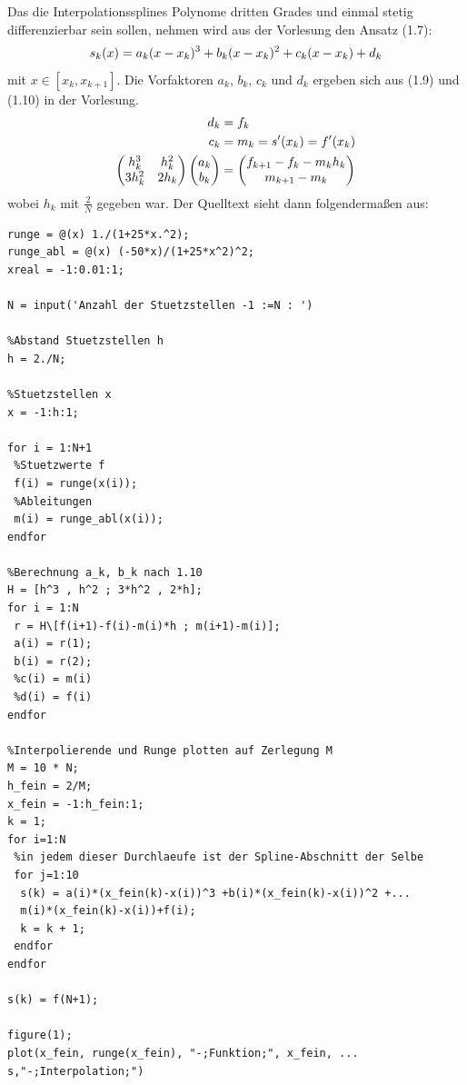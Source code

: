 \documentclass[ngerman,a4paper]{texmf/tex/latex/mathscript/mathscript}
\begin{document}
	Das die Interpolationssplines Polynome dritten Grades und einmal stetig differenzierbar sein sollen, nehmen wird aus der Vorlesung den Ansatz (1.7):
	\begin{align}
		s_k(x) = a_k(x-x_k)^3 + b_k(x-x_k)^2 + c_k(x-x_k) + d_k\notag
	\end{align}
	mit $x\in[x_k,x_{k+1}]$. Die Vorfaktoren $a_k$, $b_k$, $c_k$ und $d_k$ ergeben sich aus (1.9) und (1.10) in der Vorlesung.
	\begin{align}
		d_k &= f_k \notag \\
		c_k &= m_k = s'(x_k) = f'(x_k) \notag \\
		\begin{pmatrix}
			h_k^3 & h_k^2 \\ 3h_k^2 & 2h_k
		\end{pmatrix}\begin{pmatrix}
			a_k \\ b_k
		\end{pmatrix} &= \begin{pmatrix}
			f_{k+1} - f_k - m_kh_k \\ m_{k+1} - m_k
		\end{pmatrix}\notag
	\end{align}
	wobei $h_k$ mit $\frac{2}{N}$ gegeben war. Der Quelltext sieht dann folgendermaßen aus:
	\begin{lstlisting}
runge = @(x) 1./(1+25*x.^2);
runge_abl = @(x) (-50*x)/(1+25*x^2)^2;
xreal = -1:0.01:1;

N = input('Anzahl der Stuetzstellen -1 :=N : ')

%Abstand Stuetzstellen h
h = 2./N;

%Stuetzstellen x
x = -1:h:1;

for i = 1:N+1
 %Stuetzwerte f
 f(i) = runge(x(i));
 %Ableitungen
 m(i) = runge_abl(x(i));
endfor

%Berechnung a_k, b_k nach 1.10
H = [h^3 , h^2 ; 3*h^2 , 2*h];
for i = 1:N
 r = H\[f(i+1)-f(i)-m(i)*h ; m(i+1)-m(i)];
 a(i) = r(1);
 b(i) = r(2);
 %c(i) = m(i)
 %d(i) = f(i)
endfor

%Interpolierende und Runge plotten auf Zerlegung M
M = 10 * N;
h_fein = 2/M;
x_fein = -1:h_fein:1;
k = 1;
for i=1:N
 %in jedem dieser Durchlaeufe ist der Spline-Abschnitt der Selbe
 for j=1:10
  s(k) = a(i)*(x_fein(k)-x(i))^3 +b(i)*(x_fein(k)-x(i))^2 +...
  m(i)*(x_fein(k)-x(i))+f(i);
  k = k + 1;
 endfor
endfor

s(k) = f(N+1);

figure(1);
plot(x_fein, runge(x_fein), "-;Funktion;", x_fein, ...
s,"-;Interpolation;")
	\end{lstlisting}
	
\end{document}
